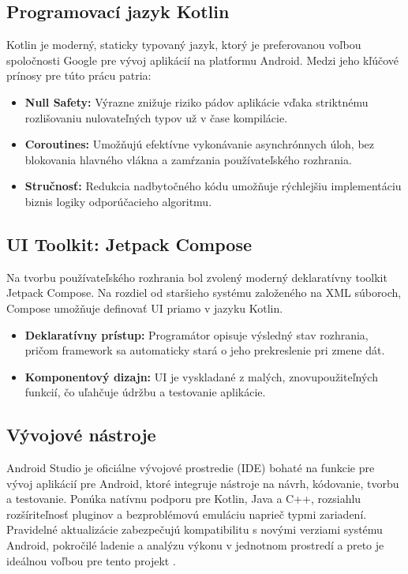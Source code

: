 \subsection{Programovací jazyk Kotlin}
Kotlin je moderný, staticky typovaný jazyk, ktorý je preferovanou voľbou spoločnosti
Google pre vývoj aplikácií na platformu Android. Medzi jeho kľúčové prínosy pre túto prácu patria: \cite{google_kotlin_android}

\begin{itemize}[noitemsep, topsep=0pt]
    \item \textbf{Null Safety:} Výrazne znižuje riziko pádov aplikácie  vďaka striktnému rozlišovaniu nulovateľných typov už v čase kompilácie.
    \item \textbf{Coroutines:} Umožňujú efektívne vykonávanie asynchrónnych úloh, bez blokovania hlavného vlákna a zamŕzania používateľského rozhrania.
    \item \textbf{Stručnosť:} Redukcia nadbytočného kódu umožňuje rýchlejšiu implementáciu biznis logiky odporúčacieho algoritmu.
\end{itemize}


\subsection{UI Toolkit: Jetpack Compose}
Na tvorbu používateľského rozhrania bol zvolený moderný deklaratívny toolkit Jetpack Compose. 
Na rozdiel od staršieho systému založeného na XML súboroch, Compose umožňuje definovať UI priamo v jazyku Kotlin.\cite{google_jetpack_compose}

\begin{itemize}[noitemsep, topsep=0pt]
    \item \textbf{Deklaratívny prístup:} Programátor opisuje výsledný stav rozhrania, pričom framework sa automaticky stará o jeho prekreslenie pri zmene dát.
    \item \textbf{Komponentový dizajn:} UI je vyskladané z malých, znovupoužiteľných funkcií, čo uľahčuje údržbu a testovanie aplikácie.
\end{itemize}

\subsection{Vývojové nástroje}
Android Studio je oficiálne vývojové prostredie (IDE) bohaté na funkcie pre vývoj aplikácií pre Android, ktoré integruje nástroje na návrh, kódovanie, tvorbu a testovanie.
Ponúka natívnu podporu pre Kotlin, Java a C++, rozsiahlu rozšíriteľnosť pluginov a bezproblémovú emuláciu naprieč typmi zariadení.
Pravidelné aktualizácie zabezpečujú kompatibilitu s novými verziami systému Android, pokročilé ladenie a analýzu výkonu v jednotnom prostredí a preto je ideálnou voľbou pre tento projekt   \cite{google_android_studio, ikkaro_android_studio}.


